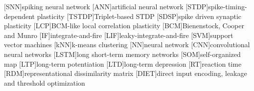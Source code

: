 \begin{acronym}[XXXX]
    [SNN]{spiking neural network}
    [ANN]{artificial neural network}
    [STDP]{spike-timing-dependent plasticity}
    [TSTDP]{Triplet-based STDP}
    [SDSP]{spike driven synaptic plasticity}
    [LCP]{BCM-like local correlation plasticity}
    [BCM]{Bienenstock, Cooper and Munro}
    [IF]{integrate-and-fire}
    [LIF]{leaky-integrate-and-fire}
    [SVM]{support vector machines}
    [kNN]{k-means clustering}
    [NN]{neural network}
    [CNN]{convolutional neural networks}
    [LSTM]{long short-term memory networks}
    [SOM]{self-organized map}
    [LTP]{long-term potentiation}
    [LTD]{long-term depression}
    [RT]{reaction time}
    [RDM]{representational dissimilarity matrix}
    [DIET]{direct input encoding, leakage and threshold optimization}
\end{acronym}